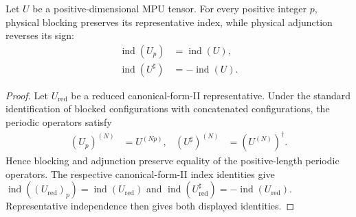 

\begin{lemma}
    \label{thm:mpu_representative_index_blocking_adjoint}
    \leanok
    Let $U$ be a positive-dimensional MPU tensor. For every positive integer
    $p$, physical blocking preserves its representative index, while
    physical adjunction reverses its sign:
    \begin{align}
        \operatorname{ind}(U_p)      & =\operatorname{ind}(U),  \\
        \operatorname{ind}(U^\sharp) & =-\operatorname{ind}(U).
    \end{align}
\end{lemma}

\begin{proof}\leanok
    Let $U_{\mathrm{red}}$ be a reduced canonical-form-II representative.
    Under the standard identification of blocked configurations with
    concatenated configurations, the periodic operators satisfy
    \begin{align}
        (U_p)^{(N)}      & = U^{(Np)},          &
        (U^\sharp)^{(N)} & = (U^{(N)})^\dagger.
    \end{align}
    Hence blocking and adjunction preserve equality of the positive-length
    periodic operators. The respective canonical-form-II index identities
    give
    $\operatorname{ind}((U_{\mathrm{red}})_p)
        =\operatorname{ind}(U_{\mathrm{red}})$ and
    $\operatorname{ind}(U_{\mathrm{red}}^\sharp)
        =-\operatorname{ind}(U_{\mathrm{red}})$.
    Representative independence then gives both displayed identities.
\end{proof}

